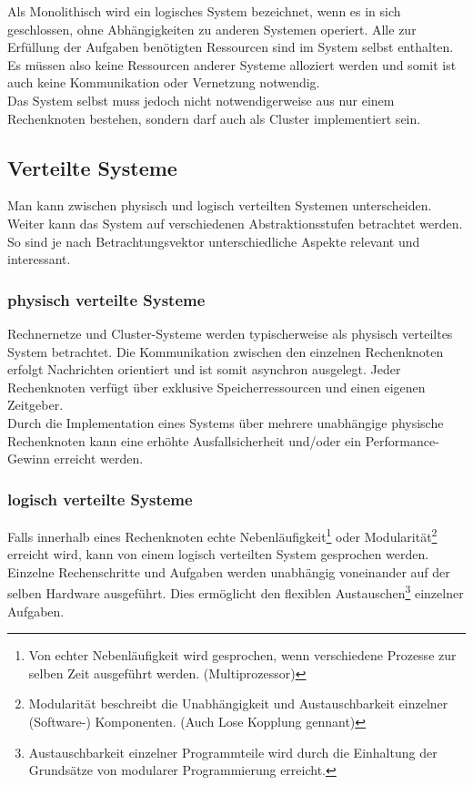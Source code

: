 \documentclass[oneside,11pt,parskip=half,ngerman]{scrreprt}
\begin{document}
Als Monolithisch wird ein logisches System bezeichnet, wenn es in sich
geschlossen, ohne Abhängigkeiten zu anderen Systemen operiert. Alle zur
Erfüllung der Aufgaben benötigten Ressourcen sind im System selbst
enthalten. Es müssen also keine Ressourcen anderer Systeme alloziert
werden und somit ist auch keine Kommunikation oder Vernetzung
notwendig.\\Das System selbst muss jedoch nicht notwendigerweise aus nur
einem Rechenknoten bestehen, sondern darf auch als Cluster implementiert
sein.

\subsection{Verteilte Systeme}\label{verteilte-systeme}

Man kann zwischen physisch und logisch verteilten Systemen
unterscheiden. Weiter kann das System auf verschiedenen
Abstraktionsstufen betrachtet werden. So sind je nach Betrachtungsvektor
unterschiedliche Aspekte relevant und interessant.
\autocite{ethdistribsystems}

\subsubsection{physisch verteilte
Systeme}\label{physisch-verteilte-systeme}

Rechnernetze und Cluster-Systeme werden typischerweise als physisch
verteiltes System betrachtet. Die Kommunikation zwischen den einzelnen
Rechenknoten erfolgt Nachrichten orientiert und ist somit asynchron
ausgelegt. Jeder Rechenknoten verfügt über exklusive Speicherressourcen
und einen eigenen Zeitgeber.\\Durch die Implementation eines Systems
über mehrere unabhängige physische Rechenknoten kann eine erhöhte
Ausfallsicherheit und/oder ein Performance-Gewinn erreicht werden.

\subsubsection{logisch verteilte
Systeme}\label{logisch-verteilte-systeme}

Falls innerhalb eines Rechenknoten echte Nebenläufigkeit\footnote{Von
  echter Nebenläufigkeit wird gesprochen, wenn verschiedene Prozesse zur
  selben Zeit ausgeführt werden. (Multiprozessor)} oder
Modularität\footnote{Modularität beschreibt die Unabhängigkeit und
  Austauschbarkeit einzelner (Software-) Komponenten. (Auch Lose
  Kopplung gennant)} erreicht wird, kann von einem logisch verteilten
System gesprochen werden. Einzelne Rechenschritte und Aufgaben werden
unabhängig voneinander auf der selben Hardware ausgeführt. Dies
ermöglicht den flexiblen Austauschen\footnote{Austauschbarkeit einzelner
  Programmteile wird durch die Einhaltung der Grundsätze von modularer
  Programmierung erreicht.} einzelner Aufgaben.
\end{document}
